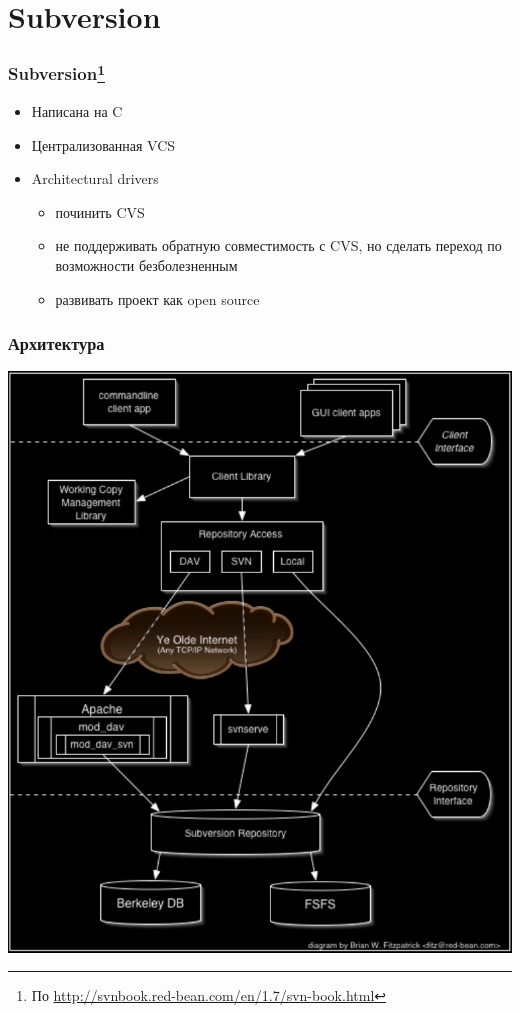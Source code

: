 \documentclass{../cscslides}
\begin{document}
    \section{Subversion}

    \begin{frame}
        \frametitle{Subversion\footnote{\tiny{По \url{http://svnbook.red-bean.com/en/1.7/svn-book.html}}}}
        \begin{itemize}
            \item Написана на C
            \item Централизованная VCS
            \item Architectural drivers
            \begin{itemize}
                \item починить CVS
                \item не поддерживать обратную совместимость с CVS, но сделать переход по возможности безболезненным
                \item развивать проект как open source
            \end{itemize}
        \end{itemize}
    \end{frame}

    \begin{frame}
        \frametitle{Архитектура}
        \begin{center}
            \includegraphics[height=0.8\textheight]{subversionArchitectureBlack.png}
        \end{center}
    \end{frame}
\end{document}
